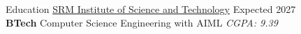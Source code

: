 \documentclass{resume} %
\begin{document}















\begin{rSection}{Education}
    \href{https://www.linkedin.com/school/s.r.m.-institute-of-science-&-technology-chennai/}{SRM Institute of Science and Technology} \hfill Expected 2027\\
\textbf{BTech} Computer Science Engineering with AIML \hfill \textit{CGPA: 9.39}
\end{rSection}
\end{document}
